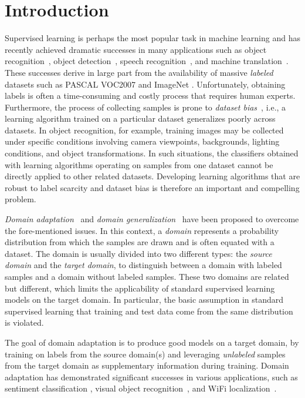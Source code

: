 \documentclass[10pt,journal,compsoc]{IEEEtran}
\begin{document}
\section{Introduction}
\label{sec:intro}
Supervised learning is perhaps the most popular task in machine learning and has recently achieved dramatic successes in many applications such as object recognition~\cite{Krizhevsky:2012aa,Simonyan2015}, object detection~\cite{girshick14CVPR}, speech recognition~\cite{dahl:13}, and machine translation~\cite{sutskever:14}.
These successes derive in large part from the availability of massive \emph{labeled} datasets such as PASCAL VOC2007 \cite{pascal-voc-2007} and ImageNet \cite{Krizhevsky:2009aa}.
Unfortunately, obtaining labels is often a time-consuming and costly process that requires human experts.
Furthermore, the process of collecting samples is prone to \emph{dataset bias}~\cite{Ponce2006,Torralba2011}, i.e., a learning algorithm trained on a particular dataset generalizes poorly across datasets.
In object recognition, for example, training images may be collected under specific conditions involving camera viewpoints, backgrounds, lighting conditions, and object transformations.
In such situations, the classifiers obtained with learning algorithms operating on samples from one dataset cannot be directly applied to other related datasets.
Developing learning algorithms that are robust to label scarcity and dataset bias is therefore an important and compelling problem.

\emph{Domain adaptation}~\cite{Blitzer:2006aa} and \emph{domain generalization}~\cite{Blanchard2011} have been proposed to overcome the fore-mentioned issues.  
In this context, a \emph{domain} represents a probability distribution from which the samples are drawn and is often equated with a dataset.
The domain is usually divided into two different types: the \emph{source domain} and the \emph{target domain}, to distinguish between a domain with labeled samples and a domain without labeled samples.
These two domains are related but different, which limits the applicability of standard supervised learning models on the target domain.
In particular, the basic assumption in standard supervised learning that training and test data come from the same distribution is violated.

The goal of domain adaptation is to produce good models on a target domain, by training on labels from the source domain(s) and leveraging \emph{unlabeled} samples from the target domain as supplementary information during training.
Domain adaptation has demonstrated significant successes in various applications, such as sentiment classification \cite{Chen:2012ab,Glorot:2011aa}, 
visual object recognition~\cite{Hoffman:2013aa,Long2014a,Saenko:2010aa,Shekhar:2013}, and WiFi localization~\cite{Pan:2009aa}.
\end{document}
